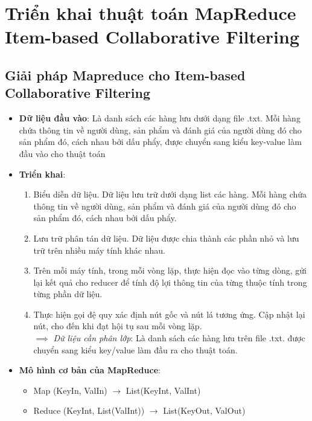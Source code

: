 \section{Triển khai thuật toán MapReduce Item-based Collaborative Filtering}
\subsection*{Giải pháp Mapreduce cho Item-based Collaborative Filtering}
\begin{itemize}
    \item \textbf{Dữ liệu đầu vào}: Là danh sách các hàng lưu dưới dạng file .txt.
          Mỗi hàng chứa thông tin về người dùng, sản phẩm và đánh giá của người dùng đó
          cho sản phẩm đó, cách nhau bởi dấu phẩy, được chuyển sang kiểu key-value làm
          đầu vào cho thuật toán
    \item \textbf{Triển khai}:
          \begin{enumerate}
              \item Biểu diễn dữ liệu. Dữ liệu lưu trữ dưới dạng list các hàng. Mỗi hàng
                    chứa thông tin về người dùng, sản phẩm và đánh giá của người dùng đó cho
                    sản phẩm đó, cách nhau bởi dấu phẩy.
              \item Lưu trữ phân tán dữ liệu. Dữ liệu được chia thành các phần nhỏ và lưu trữ
                    trên nhiều máy tính khác nhau.
              \item Trên mỗi máy tính, trong mỗi vòng lặp, thực hiện đọc vào từng dòng,
                    gửi lại kết quả cho reducer để tính độ lợi thông tin của từng thuộc tính trong từng phần dữ liệu.
              \item Thực hiện gọi đệ quy xác định nút gốc và nút lá tương ứng.
                    Cập nhật lại nút, cho đến khi đạt hội tụ sau mỗi vòng lặp.\\
                    \vspace{0.2cm}
                    \hspace*{-1cm} $\implies$ \textit{Dữ liệu cần phân lớp}: Là danh sách các hàng lưu trên file .txt. được chuyển sang kiểu key/value làm đầu ra cho thuật toán.
          \end{enumerate}
    \item \textbf{Mô hình cơ bản của MapReduce}:
          \begin{itemize}
              \item Map (KeyIn, ValIn) $\rightarrow$ List(KeyInt, ValInt)
              \item Reduce (KeyInt, List(ValInt)) $\rightarrow$ List(KeyOut, ValOut)

\end{itemize}
\end{itemize}
